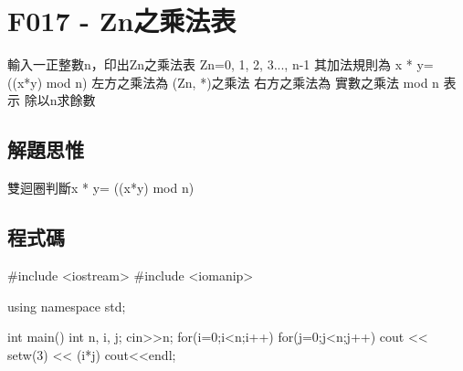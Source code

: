 \section{F017 - Zn之乘法表}
輸入一正整數n，印出Zn之乘法表 Zn={0, 1, 2, 3..., n-1} 其加法規則為 x * y= ((x*y) mod n) 左方之乘法為 (Zn, *)之乘法 右方之乘法為 實數之乘法 mod n 表示 除以n求餘數
\subsection{解題思惟}
雙迴圈判斷x * y= ((x*y) mod n)

\subsection{程式碼}
\begin{cppcode}
#include <iostream>
#include <iomanip>

using namespace std;

int main()
{
	int n, i, j;
	cin>>n;
	for(i=0;i<n;i++){
		for(j=0;j<n;j++){ 
			cout << setw(3) << (i*j)%
		}
		cout<<endl;
	}
}
\end{cppcode}

